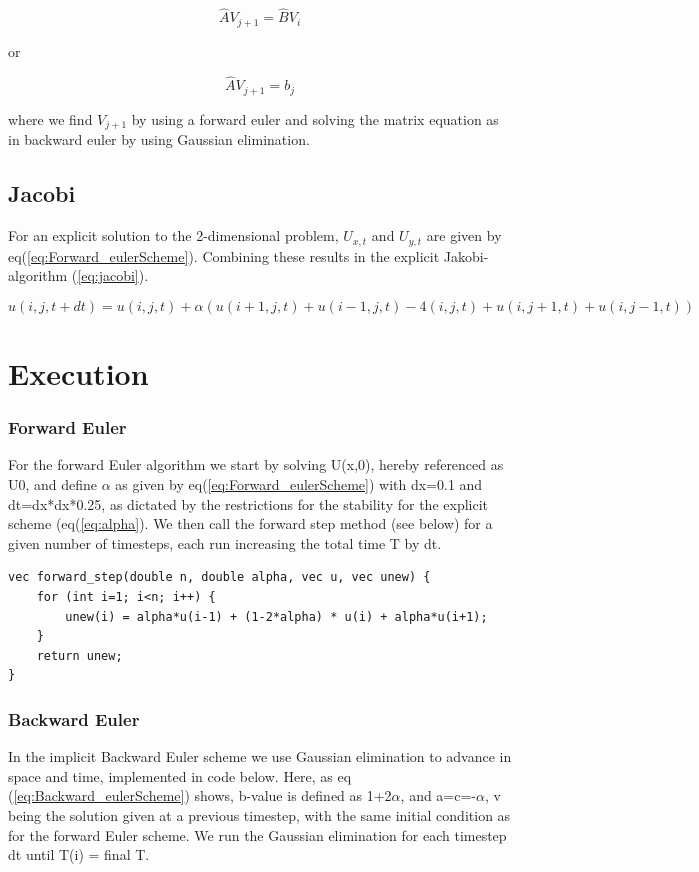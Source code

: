 \documentclass[a4paper,10pt]{article}
\begin{document}
\begin{equation}
 \hat{A}V_{j+1} = \hat{B}V_{i}
\end{equation}

or

\begin{equation}
 \hat{A}V_{j+1} = b_{j}
\end{equation}

where we find $V_{j+1}$ by using a forward euler and solving the matrix equation as in backward euler by using Gaussian elimination. 

\subsection{Jacobi}
For an explicit solution to the 2-dimensional problem, $U_{x,t}$ and $U_{y,t}$ are given by eq(\ref{eq:Forward_eulerScheme}). Combining these results in the explicit Jakobi-algorithm (\ref{eq:jacobi}).

\begin{equation}
  u(i,j,t+dt) = u(i,j,t) + \alpha(u(i+1,j,t) + u(i-1,j,t) - 4(i,j,t) + u(i,j+1,t) +
      
      u(i,j-1,t))
\label{eq:jacobi}
\end{equation}

\section{Execution}

\subsubsection{Forward Euler}
For the forward Euler algorithm we start by solving U(x,0), hereby referenced as U0, and define $\alpha$ as given by eq(\ref{eq:Forward_eulerScheme}) with dx=0.1 and dt=dx*dx*0.25, as dictated by the
restrictions for the stability for the explicit scheme (eq(\ref{eq:alpha}). We then call the forward step method (see below) for a given number of timesteps, each run increasing the total time T by dt.
\begin{verbatim}
vec forward_step(double n, double alpha, vec u, vec unew) {
    for (int i=1; i<n; i++) {
        unew(i) = alpha*u(i-1) + (1-2*alpha) * u(i) + alpha*u(i+1);
    }
    return unew;
} 
\end{verbatim}

\subsubsection{Backward Euler}
In the implicit Backward Euler scheme we use Gaussian elimination to advance in space and time, implemented in code below. Here, as eq (\ref{eq:Backward_eulerScheme}) shows, b-value is defined as
1+2$\alpha$, and a=c=-$\alpha$, v being the solution given at a previous timestep, with the same initial condition as for the forward Euler scheme. We run the Gaussian elimination for each timestep dt until T(i) = final T.
\end{document}
